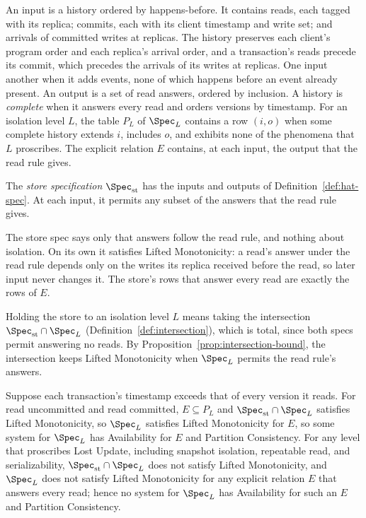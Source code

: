 \begin{definition}
\label{def:hat-spec}
An input is a history ordered by happens-before.  It contains reads, each
tagged with its replica; commits, each with its client timestamp and write set; and arrivals
of committed writes at replicas.  The history preserves
each client's program order and each replica's arrival order, and a
transaction's reads precede its commit, which precedes the arrivals of its
writes at replicas.
One input \inrel another when it adds events, none of which happens before an
event already present.  An output is a set of read
answers, ordered by inclusion.  A history is \emph{complete} when it answers
every read and orders versions by timestamp.  For an isolation level $L$, the
table $P_L$ of $\Spec_L$ contains a row $(i,o)$ when some complete history
extends $i$, includes $o$, and exhibits none of the phenomena that $L$
proscribes.  The explicit relation $E$ contains, at each input, the output that
the read rule gives.
\end{definition}

\begin{definition}
\label{def:store-spec}
The \emph{store specification} $\Spec_{\mathrm{st}}$ has the inputs and outputs
of Definition~\ref{def:hat-spec}.  At each input, it permits any subset of the
answers that the read rule gives.
\end{definition}

The store spec says only that answers follow the read rule, and nothing about
isolation.  On its own it satisfies Lifted Monotonicity: a read's answer under the read rule depends only on the writes its replica received
before the read, so later input never changes it.  The store's rows that answer
every read are exactly the rows of $E$.

Holding the store to an isolation level $L$ means taking the intersection
$\Spec_{\mathrm{st}}\cap\Spec_L$ (Definition~\ref{def:intersection}), which
is total, since both specs permit
answering no reads.  By Proposition~\ref{prop:intersection-bound}, the
intersection keeps Lifted Monotonicity when $\Spec_L$ permits the read rule's
answers.

\begin{theorem}
\label{thm:hat-levels}
Suppose each transaction's timestamp exceeds that of every version it reads.
For read uncommitted and read committed, $E\subseteq P_L$ and
$\Spec_{\mathrm{st}}\cap\Spec_L$ satisfies Lifted Monotonicity, so $\Spec_L$
satisfies Lifted Monotonicity for $E$, so some system for $\Spec_L$ has
Availability for $E$ and Partition Consistency.  For any level that proscribes
Lost Update, including snapshot isolation, repeatable read, and
serializability, $\Spec_{\mathrm{st}}\cap\Spec_L$ does not satisfy Lifted
Monotonicity, and $\Spec_L$ does not satisfy Lifted Monotonicity for any
explicit relation $E$ that answers every read; hence no system for $\Spec_L$
has Availability for such an $E$ and Partition Consistency.
\end{theorem}

